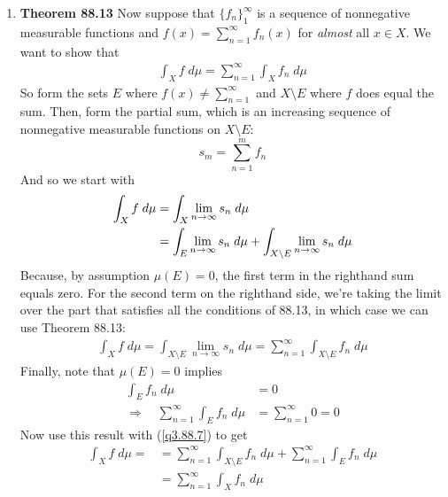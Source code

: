 \documentclass[12pt]{article}
\theoremstyle{plain}
\theoremstyle{definition}
\theoremstyle{remark}
\begin{document}
\begin{enumerate}
\begin{enumerate}
\item \textbf{Theorem 88.13} Now suppose that $\{f_n\}^\infty_1$ is a sequence of nonnegative measurable functions and $f(x)=\sum^\infty_{n=1} f_n(x)$ for \emph{almost} all $x\in X$. We want to show that 
\begin{align*}
    \int_X f \; d\mu = \sum^\infty_{n=1} \int_X f_n \; d\mu
\end{align*}
So form the sets $E$ where $f(x)\neq  \sum^\infty_{n=1}$ and $X\setminus E$ where $f$ does equal the sum. Then, form the partial sum, which is an increasing sequence of nonnegative measurable functions on $X\setminus E$:
\[
    s_m = \sum^m_{n=1} f_n
\]
And so we start with
\begin{align}
    \label{q3.88.7}
    \int_X f \; d\mu &=  
    \int_X \lim_{n\rightarrow\infty} s_n \; d\mu \notag \\
    &= \int_E \lim_{n\rightarrow\infty} s_n \; d\mu +  
    \int_{X\setminus E} \lim_{n\rightarrow\infty} s_n \; d\mu 
\end{align}
Because, by assumption $\mu(E)=0$, the first term in the righthand sum equals zero. For the second term on the righthand side, we're taking the limit over the part that satisfies all the conditions of 88.13, in which case we can use Theorem 88.13:
\begin{align*}
    \int_X f \; d\mu =  
    \int_{X\setminus E} \lim_{n\rightarrow\infty} s_n \; d\mu =
    \sum^\infty_{n=1}\int_{X\setminus E} f_n \; d\mu 
\end{align*}
Finally, note that $\mu(E)=0$ implies
\begin{align*}
    \int_E f_n \; d\mu &= 0 \\
    \Rightarrow\quad  \sum^\infty_{n=1} \int_E f_n \;d\mu 
    &= \sum^\infty_{n=1}  0 = 0
\end{align*}
Now use this result with (\ref{q3.88.7}) to get
\begin{align*}
    \int_X f \; d\mu =  
    &= \sum^\infty_{n=1}\int_{X\setminus E} f_n \; d\mu 
    + \sum^\infty_{n=1} \int_E f_n \;d\mu \\
    &= \sum^\infty_{n=1}\int_{X} f_n \; d\mu 
\end{align*}


\end{enumerate}
\end{enumerate}
\end{document}
